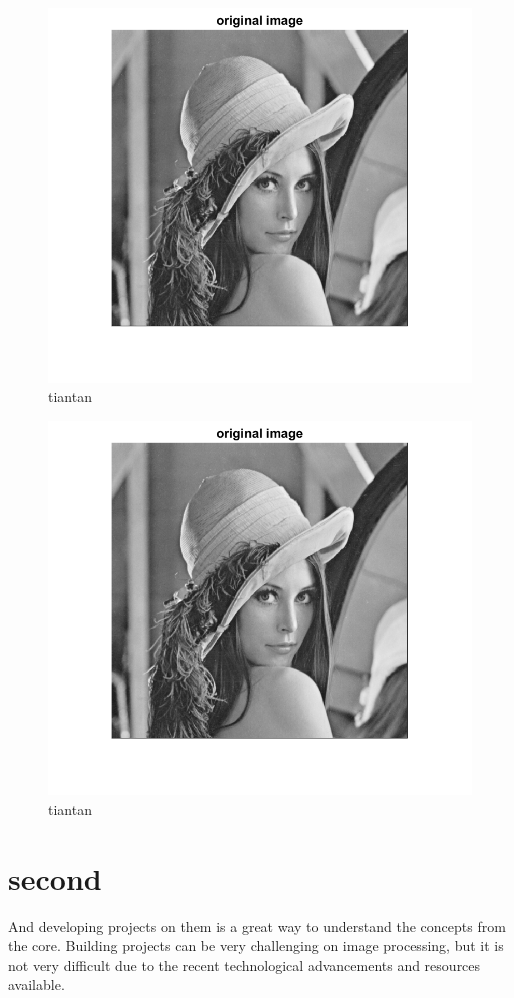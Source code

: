 \documentclass{article}
\begin{document}
\begin{figure}[!hbtp]
	\centering
	\includegraphics[width=\linewidth]{origin.png}
	\caption{tiantan}
	\label{fig:tiantan}
\end{figure}
\clearpage
\begin{figure}[!hbtp]
	\centering
	\includegraphics[height=0.5\linewidth]{origin.png}
	\caption{tiantan}
	\label{fig:tiantan}
\end{figure}
\section{second}
And developing projects on them is a great way to understand the concepts from the core. Building projects can be very challenging on image processing, but it is not very difficult due to the recent technological advancements and resources available.
\end{document}
